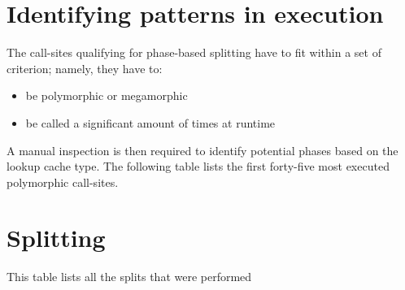 \documentclass[preprint]{acmart}
\begin{document}
\section{Identifying patterns in execution}

The call-sites qualifying for phase-based splitting have to fit within a set of criterion; namely, they have to:
 \begin{itemize}
 \item be polymorphic or megamorphic
 \item be called a significant amount of times at runtime
 \end{itemize}

A manual inspection is then required to identify potential phases based on the lookup cache type. The following table lists the first forty-five most executed polymorphic call-sites.

\begin{landscape}

\SuperHottestMegamorphic{}

\end{landscape}

\appendix

\section{Splitting}

This table lists all the splits that were performed

\EffectSplitting



\end{document}
